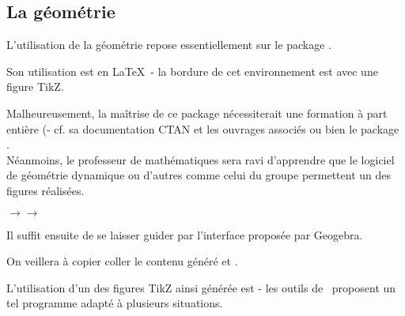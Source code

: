 \subsection{La géométrie}
\begin{Methode}
        
        L'utilisation de la géométrie repose essentiellement sur le package . 

        Son utilisation est  en \LaTeX\ - la bordure de cet environnement est  avec une figure TikZ.

        Malheureusement, la maîtrise de ce package nécessiterait une formation à part entière (- cf. sa documentation CTAN et les ouvrages associés  ou bien le package .\\


        Néanmoins, le professeur de mathématiques sera ravi d'apprendre que le logiciel de géométrie dynamique  ou d'autres comme celui du groupe  permettent un  des figures réalisées. 

        \vspace{-0.45cm}\begin{center}
            $\longrightarrow$$\longrightarrow$
        \end{center}

        \vspace{-0.3cm}Il suffit ensuite de se laisser guider par l'interface proposée par Geogebra.

        On veillera à copier coller le contenu généré   et .

        L'utilisation d'un  des figures TikZ ainsi générée est  - les outils de \bfcours\ proposent un tel programme adapté à plusieurs situations. 
    \end{Methode}